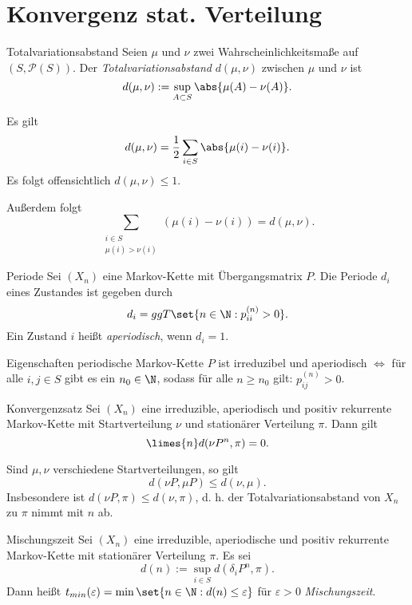 \section{Konvergenz stat. Verteilung}

\begin{karte}{Totalvariationsabstand}
    Seien \(\mu\) und \(\nu\) zwei Wahrscheinlichkeitsmaße auf \((S, \mathcal{P}(S))\).
    Der \textit{Totalvariationsabstand} \(d(\mu,\nu)\) zwischen \(\mu\) und \(\nu\) ist 
    \[ d(\mu,\nu) := \sup_{A\subset S} \abs{\mu(A) - \nu(A)}. \]

    Es gilt 
    \[ d(\mu,\nu) = \frac{1}{2} \sum_{i\in S} \abs{\mu(i) - \nu(i)}. \]
    Es folgt offensichtlich \(d(\mu,\nu) \leq 1\).

    Außerdem folgt 
    \[ \sum_{\substack{i\in S\\\mu(i)>\nu(i)}} (\mu(i) - \nu(i)) = d(\mu,\nu). \]
\end{karte}

\begin{karte}{Periode}
    Sei \((X_n)\) eine Markov-Kette mit Übergangsmatrix \(P\). Die 
    Periode \(d_i\) eines Zustandes ist gegeben durch 
    \[ d_i = ggT\set{n\in \N: p_{ii}^{(n)} > 0}. \]
    Ein Zustand \(i\) heißt \textit{aperiodisch}, wenn \(d_i = 1\).
\end{karte}

\begin{karte}{Eigenschaften periodische Markov-Kette}
    \(P\) ist irreduzibel und aperiodisch \(\Leftrightarrow\)
    für alle \(i,j\in S\) gibt es ein \(n_0\in \N\), sodass 
    für alle \(n\geq n_0\) gilt: \(p_{ij}^{(n)} > 0\).
\end{karte}

\begin{karte}{Konvergenzsatz}
    Sei \((X_n)\) eine irreduzible, aperiodisch und positiv rekurrente Markov-Kette mit Startverteilung \(\nu\) 
    und stationärer Verteilung \(\pi\). Dann gilt 
    \[ \limes{n} d(\nu P^n, \pi) = 0. \]

    Sind \(\mu, \nu\) verschiedene Startverteilungen, so gilt 
    \[ d(\nu P, \mu P) \leq d(\nu, \mu). \]
    Insbesondere ist \(d(\nu P, \pi) \leq d(\nu,\pi)\), d. h. der Totalvariationsabstand 
    von \(X_n\) zu \(\pi\) nimmt mit \(n\) ab.
\end{karte}

\begin{karte}{Mischungszeit}
    Sei \((X_n)\) eine irreduzible, aperiodische und positiv rekurrente 
    Markov-Kette mit stationärer Verteilung \(\pi\). Es sei 
    \[ d(n) := \sup_{i\in S} d(\delta_i P^n, \pi). \]
    Dann heißt \( t_{min}(\varepsilon) = \min \set{n\in \N: d(n)\leq \varepsilon} \) 
    für \(\varepsilon > 0\) \textit{Mischungszeit}.
\end{karte}

